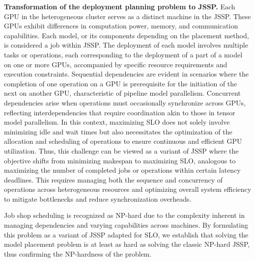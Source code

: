 \noindent \textbf{Transformation of the deployment planning problem to JSSP.} Each GPU in the heterogeneous cluster serves as a distinct machine in the JSSP. These GPUs exhibit differences in computation power, memory, and communication capabilities. Each model, or its components depending on the placement method, is considered a job within JSSP. The deployment of each model involves multiple tasks or operations, each corresponding to the deployment of a part of a model on one or more GPUs, accompanied by specific resource requirements and execution constraints. Sequential dependencies are evident in scenarios where the completion of one operation on a GPU is prerequisite for the initiation of the next on another GPU, characteristic of pipeline model parallelism. Concurrent dependencies arise when operations must occasionally synchronize across GPUs, reflecting interdependencies that require coordination akin to those in tensor model parallelism. In this context, maximizing SLO does not solely involve minimizing idle and wait times but also necessitates the optimization of the allocation and scheduling of operations to ensure continuous and efficient GPU utilization. Thus, this challenge can be viewed as a variant of JSSP where the objective shifts from minimizing makespan to maximizing SLO, analogous to maximizing the number of completed jobs or operations within certain latency deadlines. This requires managing both the sequence and concurrency of operations across heterogeneous resources and optimizing overall system efficiency to mitigate bottlenecks and reduce synchronization overheads.

Job shop scheduling is recognized as NP-hard due to the complexity inherent in managing dependencies and varying capabilities across machines. By formulating this problem as a variant of JSSP adapted for SLO, we establish that solving the model placement problem is at least as hard as solving the classic NP-hard JSSP, thus confirming the NP-hardness of the problem.



